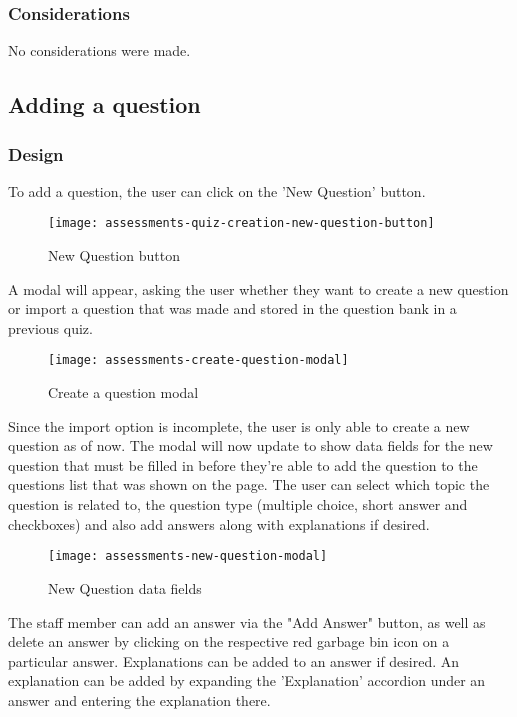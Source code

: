 \subsubsection{Considerations}
No considerations were made.

\subsection{Adding a question}

\subsubsection{Design}
To add a question, the user can click on the 'New Question' button.

\begin{figure}[h!]
	\centering
	\texttt{[image: assessments-quiz-creation-new-question-button]}
	\caption{New Question button}
\end{figure}

A modal will appear, asking the user whether they want to create a new question or import a question that was made and stored in the question bank in a previous quiz. 

\begin{figure}[h!]
	\centering
	\texttt{[image: assessments-create-question-modal]}
	\caption{Create a question modal}
\end{figure}

Since the import option is incomplete, the user is only able to create a new question as of now. The modal will now update to show data fields for the new question that must be filled in before they're able to add the question to the questions list that was shown on the page. The user can select which topic the question is related to, the question type (multiple choice, short answer and checkboxes) and also add answers along with explanations if desired.

\begin{figure}[h!]
	\centering
	\texttt{[image: assessments-new-question-modal]}
	\caption{New Question data fields}
\end{figure}

The staff member can add an answer via the "Add Answer" button, as well as delete an answer by clicking on the respective red garbage bin icon on a particular answer. Explanations can be added to an answer if desired. An explanation can be added by expanding the 'Explanation' accordion under an answer and entering the explanation there.

